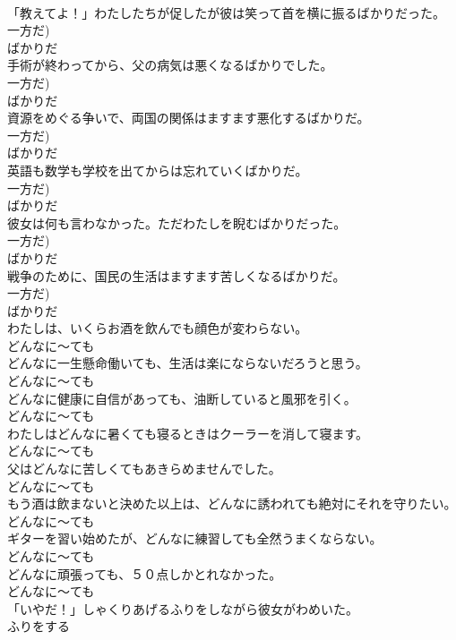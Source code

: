 \documentclass[8pt]{extreport}
\begin{document}
\begin{CJK}{UTF8}{min}
\\	「教えてよ！」わたしたちが促したが彼は笑って首を横に振るばかりだった。	
\\	一方だ)	
\\	ばかりだ
\\	手術が終わってから、父の病気は悪くなるばかりでした。	
\\	一方だ)	
\\	ばかりだ
\\	資源をめぐる争いで、両国の関係はますます悪化するばかりだ。	
\\	一方だ)	
\\	ばかりだ
\\	英語も数学も学校を出てからは忘れていくばかりだ。	
\\	一方だ)	
\\	ばかりだ
\\	彼女は何も言わなかった。ただわたしを睨むばかりだった。	
\\	一方だ)	
\\	ばかりだ
\\	戦争のために、国民の生活はますます苦しくなるばかりだ。	
\\	一方だ)	
\\	ばかりだ
\\	わたしは、いくらお酒を飲んでも顔色が変わらない。	
\\	どんなに～ても
\\	どんなに一生懸命働いても、生活は楽にならないだろうと思う。	
\\	どんなに～ても
\\	どんなに健康に自信があっても、油断していると風邪を引く。	
\\	どんなに～ても
\\	わたしはどんなに暑くても寝るときはクーラーを消して寝ます。	
\\	どんなに～ても
\\	父はどんなに苦しくてもあきらめませんでした。	
\\	どんなに～ても
\\	もう酒は飲まないと決めた以上は、どんなに誘われても絶対にそれを守りたい。	
\\	どんなに～ても
\\	ギターを習い始めたが、どんなに練習しても全然うまくならない。	
\\	どんなに～ても
\\	どんなに頑張っても、５０点しかとれなかった。	
\\	どんなに～ても
\\	「いやだ！」しゃくりあげるふりをしながら彼女がわめいた。	
\\	ふりをする

\end{CJK}
\end{document}
